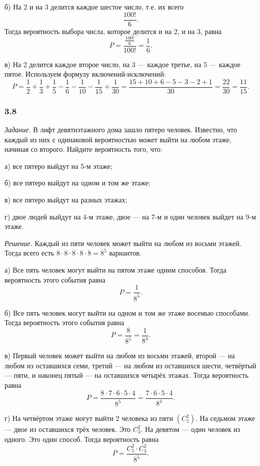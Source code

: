 \documentclass{book}
\begin{document}
б) На 2 и на 3 делится каждое шестое число, т.е. их всего
$$ \frac{100!}{6}.$$
Тогда вероятность выбора числа, которое делится и на 2, и на 3, равна
$$P =
\frac{ \frac{100!}{6} }{100!} =
\frac{1}{6}.$$

в) На 2 делится каждое второе число, на 3 --- каждое третье, на 5 --- каждое пятое.
Используем формулу включений-исключений:
$$P =
\frac{1}{2} + \frac{1}{3} + \frac{1}{5} - \frac{1}{6} - \frac{1}{10} - \frac{1}{15} + \frac{1}{30} =
\frac{15+10+6-5-3-2+1}{30} =
\frac{22}{30} =
\frac{11}{15}.$$

\subsubsection*{3.8}

\textit{Задание.} В лифт девятиэтажного дома зашло пятеро человек.
Известно, что каждый из них с одинаковой вероятностью может выйти на любом этаже, начиная со второго.
Найдите вероятность того, что:

а) все пятеро выйдут на 5-м этаже;

б) все пятеро выйдут на одном и том же этаже;

в) все пятеро выйдут на разных этажах;

г) двое людей выйдут на 4-м этаже, двое --- на 7-м и один человек выйдет на 9-м этаже.

\textit{Решение.} Каждый из пяти человек может выйти на любом из восьми этажей.
Тогда всего есть $8 \cdot 8 \cdot 8 \cdot 8 \cdot 8 = 8^5$ вариантов.

а) Все пять человек могут выйти на пятом этаже одним способов.
Тогда вероятность этого события равна
$$P =
\frac{1}{8^5}.$$

б) Все пять человек могут выйти на одном и том же этаже восемью способами.
Тогда вероятность этого события равна
$$P =
\frac{8}{8^5} =
\frac{1}{8^4}.$$

в) Первый человек может выйти на любом из восьми этажей, второй --- на любом из оставшихся семи,
третий --- на любом из оставшихся шести, четвёртый --- пяти, и наконец пятый --- на оставшихся четырёх этажах.
Тогда вероятность равна
$$P =
\frac{8 \cdot 7 \cdot 6 \cdot 5 \cdot 4}{8^5} =
\frac{7 \cdot 6 \cdot 5 \cdot 4}{8^4}.$$

г) На четвёртом этаже могут выйти 2 человека из пяти $ \left( C_5^2 \right) $.
На седьмом этаже --- двое из оставшихся трёх человек.
Это $C_3^2$.
На девятом --- один человек из одного.
Это один способ.
Тогда вероятность равна
$$P =
\frac{C_5^2 \cdot C_3^2}{8^5}.$$
\end{document}
